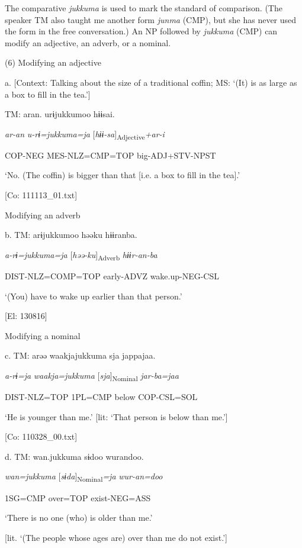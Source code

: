 The comparative \textit{jukkuma} is used to mark the standard of comparison. (The speaker TM also taught me another form \textit{junma} (CMP), but she has never used the form in the free conversation.) An NP followed by \textit{jukkuma} (CMP) can modify an adjective, an adverb, or a nominal.

(6)  Modifying an adjective

  a.  [Context: Talking about the size of a traditional coffin; MS: ‘(It) is as large as a box to fill in the tea.’]

    TM:  aran.  urɨjukkumoo  hɨɨsai.

      \textit{ar-an}  \textit{u-rɨ=jukkuma=ja}  [\textit{hɨɨ-sa}]\textsubscript{Adjective}\textit{+ar-i}

      COP-NEG  MES-NLZ=CMP=TOP  big-ADJ+STV-NPST

      ‘No. (The coffin) is bigger than that [i.e. a box to fill in the tea].’

      [Co: 111113\_01.txt]

  Modifying an adverb

  b.  TM:  arɨjukkumoo  həəku  hɨɨranba.

      \textit{a-rɨ=jukkuma=ja}  [\textit{həə-ku}]\textsubscript{Adverb}  \textit{hɨɨr-an-ba}

      DIST-NLZ=COMP=TOP  early-ADVZ  wake.up-NEG-CSL

      ‘(You) have to wake up earlier than that person.’

      [El: 130816]

  Modifying a nominal

  c.  TM:  arəə  waakjajukkuma  sja  jappajaa.

      \textit{a-rɨ=ja}  \textit{waakja=jukkuma}  [\textit{sja}]\textsubscript{Nominal}  \textit{jar-ba=jaa}

      DIST-NLZ=TOP  1PL=CMP  below  COP-CSL=SOL

      ‘He is younger than me.’ [lit: ‘That person is below than me.’]

      [Co: 110328\_00.txt]

  d.  TM:  wan.jukkuma  sɨdoo  wurandoo.

      \textit{wan=jukkuma}  [\textit{sɨda}]\textsubscript{Nominal}\textit{=ja}  \textit{wur-an=doo}

      1SG=CMP  over=TOP  exist-NEG=ASS

      ‘There is no one (who) is older than me.’

[lit. ‘(The people whose ages are) over than me do not exist.’]

